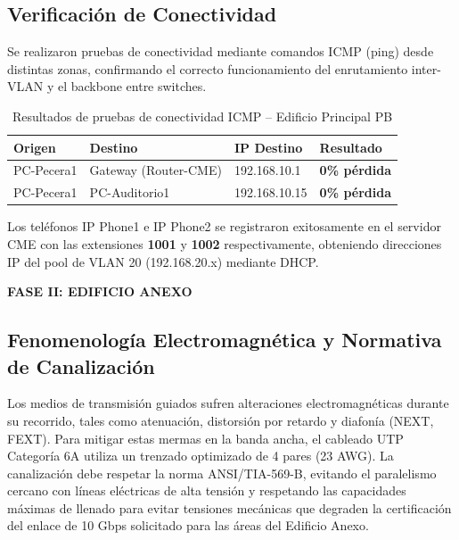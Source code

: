 \documentclass[11pt, letterpaper]{article}
\begin{document}
\subsection*{Verificación de Conectividad}

Se realizaron pruebas de conectividad mediante comandos ICMP (ping) desde distintas zonas, confirmando el correcto funcionamiento del enrutamiento inter-VLAN y el backbone entre switches.

\begin{table}[h!]
\centering
{}
\renewcommand{\arraystretch}{1.3}
\begin{tabularx}{\textwidth}{@{} l l l l @{}}
\toprule
\rowcolor{AzulUNAM!10}
\textbf{Origen} & \textbf{Destino} & \textbf{IP Destino} & \textbf{Resultado} \\ \midrule
PC-Pecera1 & Gateway (Router-CME) & 192.168.10.1 & \textcolor{green!60!black}{\textbf{0\% pérdida}} \\
PC-Pecera1 & PC-Auditorio1 & 192.168.10.15 & \textcolor{green!60!black}{\textbf{0\% pérdida}} \\ \bottomrule
\end{tabularx}
\caption{Resultados de pruebas de conectividad ICMP -- Edificio Principal PB}
\end{table}

Los teléfonos IP Phone1 e IP Phone2 se registraron exitosamente en el servidor CME con las extensiones \textbf{1001} y \textbf{1002} respectivamente, obteniendo direcciones IP del pool de VLAN 20 (192.168.20.x) mediante DHCP.


\newpage
\vspace*{1cm}
\begin{tcolorbox}[enhanced, colback=OroUNAM, colframe=OroUNAM, arc=0mm, 
                  halign=center, valign=center, top=4mm, bottom=4mm]
    \LARGE\bfseries\color{white} FASE II: EDIFICIO ANEXO
\end{tcolorbox}
\vspace{0.5cm}

\setcounter{section}{7}
\setcounter{subsection}{0}

\subsection{Fenomenología Electromagnética y Normativa de Canalización}
Los medios de transmisión guiados sufren alteraciones electromagnéticas durante su recorrido, tales como atenuación, distorsión por retardo y diafonía (NEXT, FEXT). Para mitigar estas mermas en la banda ancha, el cableado UTP Categoría 6A utiliza un trenzado optimizado de 4 pares (23 AWG). La canalización debe respetar la norma ANSI/TIA-569-B, evitando el paralelismo cercano con líneas eléctricas de alta tensión y respetando las capacidades máximas de llenado para evitar tensiones mecánicas que degraden la certificación del enlace de 10 Gbps solicitado para las áreas del Edificio Anexo.
\end{document}
